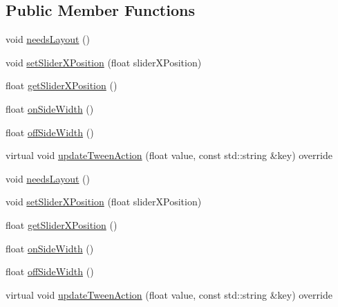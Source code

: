 \subsection*{Public Member Functions}
\begin{DoxyCompactItemize}
\item 
void \hyperlink{classControlSwitchSprite_ad05bb7ba460a9c5f9c50c117f190343e}{needs\+Layout} ()
\item 
void \hyperlink{classControlSwitchSprite_a408d710ac10a8facaf90ef18642a67ff}{set\+Slider\+X\+Position} (float slider\+X\+Position)
\item 
float \hyperlink{classControlSwitchSprite_a7c9434c61807a59e6ac34dbb2e7e840c}{get\+Slider\+X\+Position} ()
\item 
float \hyperlink{classControlSwitchSprite_a2f26fd77549832b80f52f6a8329888ad}{on\+Side\+Width} ()
\item 
float \hyperlink{classControlSwitchSprite_a5adf5658b1b11814c13dd1ff5dc8d6b3}{off\+Side\+Width} ()
\item 
virtual void \hyperlink{classControlSwitchSprite_a084b47aa783c1e03e14a87f73ae511b3}{update\+Tween\+Action} (float value, const std\+::string \&key) override
\item 
void \hyperlink{classControlSwitchSprite_ad05bb7ba460a9c5f9c50c117f190343e}{needs\+Layout} ()
\item 
void \hyperlink{classControlSwitchSprite_a408d710ac10a8facaf90ef18642a67ff}{set\+Slider\+X\+Position} (float slider\+X\+Position)
\item 
float \hyperlink{classControlSwitchSprite_a7c9434c61807a59e6ac34dbb2e7e840c}{get\+Slider\+X\+Position} ()
\item 
float \hyperlink{classControlSwitchSprite_a2f26fd77549832b80f52f6a8329888ad}{on\+Side\+Width} ()
\item 
float \hyperlink{classControlSwitchSprite_a5adf5658b1b11814c13dd1ff5dc8d6b3}{off\+Side\+Width} ()
\item 
virtual void \hyperlink{classControlSwitchSprite_ad8a83b2b2fdf822e067ade20df0df786}{update\+Tween\+Action} (float value, const std\+::string \&key) override
\end{DoxyCompactItemize}
